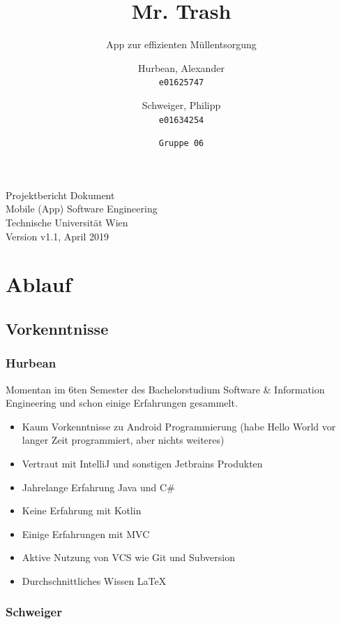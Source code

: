 \documentclass{mrtrash}
\title{\vspace{-1cm}Mr. Trash}
\subtitle{App zur effizienten Müllentsorgung}
\author{
    Hurbean, Alexander\\
    \texttt{e01625747}
    \and
    Schweiger, Philipp\\
    \texttt{e01634254}
    \and
    \texttt{Gruppe 06}}
\begin{document}
\maketitle

\null\vfill
\noindent
Projektbericht Dokument\\ 
Mobile (App) Software Engineering\\
Technische Universität Wien\\
Version v1.1, April 2019
\newpage

\tableofcontents

\chapter{Ablauf}

\section{Vorkenntnisse}

\subsection{Hurbean}

Momentan im 6ten Semester des Bachelorstudium Software \& Information Engineering und schon einige Erfahrungen gesammelt.

\begin{itemize}
    \item Kaum Vorkenntnisse zu Android Programmierung (habe Hello World vor langer Zeit programmiert, aber nichts weiteres)
    \item Vertraut mit IntelliJ und sonstigen Jetbrains Produkten
    \item Jahrelange Erfahrung Java und C\#
    \item Keine Erfahrung mit Kotlin
    \item Einige Erfahrungen mit MVC
    \item Aktive Nutzung von VCS wie Git und Subversion
    \item Durchschnittliches Wissen \LaTeX
\end{itemize}

\begin{minipage}[t]{\textwidth}
    \centering
\end{minipage}

\subsection{Schweiger}
\end{document}
